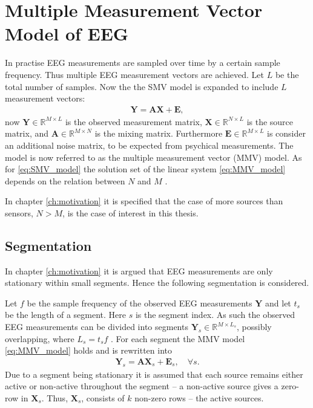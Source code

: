\section{Multiple Measurement Vector Model of EEG}\label{sec:MMV}
In practise EEG measurements are sampled over time by a certain sample frequency. 
Thus multiple EEG measurement vectors are achieved.
Let $L$ be the total number of samples. Now the  
the SMV model is expanded to include $L$ measurement vectors:
\begin{align}\label{eq:MMV_model}
\mathbf{Y} = \mathbf{AX}+\textbf{E},
\end{align}
now $\mathbf{Y} \in \mathbb{R}^{M \times L}$ is the observed measurement matrix, $\mathbf{X} \in \mathbb{R}^{N \times L}$ is the source matrix, and $\mathbf{A} \in \mathbb{R}^{M \times N}$ is the mixing matrix. 
Furthermore $\textbf{E} \in \mathbb{R}^{M \times L}$ is consider an additional noise matrix, to be expected from psychical measurements.  
The model is now referred to as the multiple measurement vector (MMV) model.
As for \eqref{eq:SMV_model} the solution set of the linear system \eqref{eq:MMV_model} depends on the relation between $N$ and $M$ \cite[p. 42]{CS}. 

In chapter \ref{ch:motivation} it is specified that the case of more sources than sensors, $N>M$, is the case of interest in this thesis.  

\subsection{Segmentation}
In chapter \ref{ch:motivation} it is argued that EEG measurements are only stationary within small segments. 
Hence the following segmentation is considered.   

Let $f$ be the sample frequency of the observed EEG measurements $\mathbf{Y}$ and let $t_s$ be the length of a segment. 
Here $s$ is the segment index. 
As such the observed EEG measurements can be divided into segments  $\mathbf{Y}_s \in \mathbb{R}^{M \times L_{s}}$, possibly overlapping, where $L_s = t_{s}f$ . 
For each segment the MMV model \eqref{eq:MMV_model} holds and is rewritten into
\begin{align}\label{eq:MMV_seg}
\mathbf{Y}_s = \mathbf{AX}_s + \textbf{E}_s, \quad \forall s.
\end{align}
Due to a segment being stationary it is assumed that each source remains either active or non-active throughout the segment -- a non-active source gives a zero-row in $\textbf{X}_s$.
Thus, $\mathbf{X}_s$, consists of $k$ non-zero rows -- the active sources.

